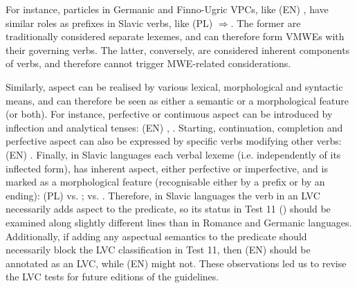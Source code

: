\documentclass[output=paper,modfonts]{langscibook}
\begin{document}
For instance, particles in Germanic and Finno-Ugric VPCs, like (EN) , have similar roles as prefixes in Slavic verbs, like (PL)  $\Rightarrow$. The former are traditionally considered separate lexemes, and can therefore form VMWEs with their governing verbs. The latter, conversely, are considered inherent components of verbs, and therefore cannot trigger MWE-related considerations.

Similarly, aspect can be realised by various lexical, morphological and syntactic means, and can therefore be seen as either a semantic or a morphological feature (or both). For instance, perfective or continuous aspect can be introduced by inflection and analytical tenses: (EN) , . Starting, continuation, completion and perfective aspect can also be expressed by specific verbs modifying other verbs: (EN) . Finally, in Slavic languages each verbal lexeme (i.e. independently of its inflected form), has inherent aspect, either perfective or imperfective, and is marked as a morphological feature (recognisable either by a prefix or by an ending): (PL) 
  vs. ;
 vs. . 
Therefore, in Slavic languages the verb in an LVC necessarily adds aspect to the predicate, so its status in Test 11 () should be examined along slightly different lines than in Romance and Germanic languages. Additionally, if adding any aspectual semantics to the predicate should necessarily block the LVC classification in Test 11, then (EN)  should be annotated as an LVC, while (EN)  might not. These observations led us to revise the LVC tests for future editions of the guidelines.
\end{document}
